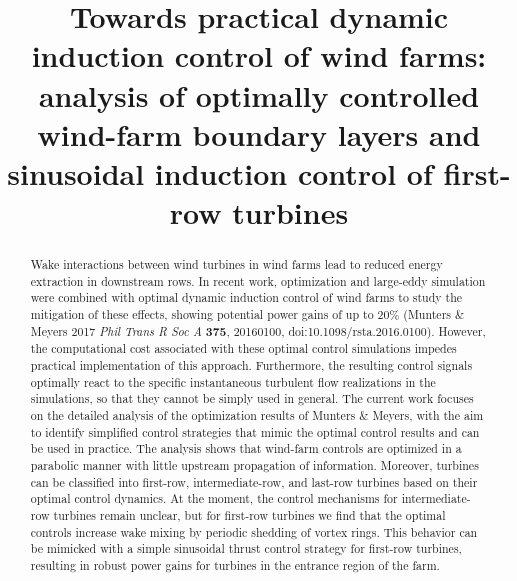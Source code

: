\documentclass[wes, manuscript]{copernicus}
\begin{document}
\title{Towards practical dynamic induction control of wind farms: analysis of optimally controlled wind-farm boundary layers and sinusoidal induction control of first-row turbines}




\received{}
\pubdiscuss{} %
\revised{}
\accepted{}
\published{}

\maketitle

\begin{abstract}
	Wake interactions between wind turbines in wind farms lead to reduced energy extraction in downstream rows. In recent work, optimization and large-eddy simulation were combined with optimal dynamic induction control of wind farms to study the mitigation of these effects, showing potential power gains of up to 20\% (Munters \& Meyers 2017 \emph{Phil Trans R Soc A} \textbf{375}, 20160100, doi:10.1098/rsta.2016.0100). However, the computational cost associated with these optimal control simulations impedes practical implementation of this approach. Furthermore, the resulting control signals optimally react to the specific instantaneous turbulent flow realizations in the simulations, so that they cannot be simply used in general. The current work focuses on the detailed analysis of the optimization results of Munters \& Meyers, with the aim to identify simplified control strategies that mimic the optimal control results and can be used in practice. The analysis shows that wind-farm controls are optimized in a parabolic manner with little upstream propagation of information. Moreover, turbines can be classified into first-row, intermediate-row, and last-row turbines based on their optimal control dynamics. At the moment, the control mechanisms for intermediate-row turbines remain unclear, but for first-row turbines we find that the optimal controls increase wake mixing by periodic shedding of vortex rings. This behavior can be mimicked with a simple sinusoidal thrust control strategy for first-row turbines, resulting in robust power gains for turbines in the entrance region of the farm.
\end{abstract}
\end{document}
